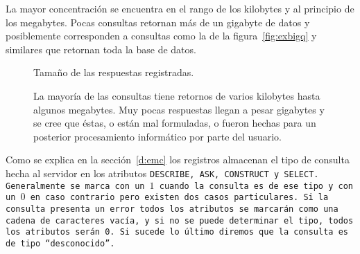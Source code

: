 La mayor concentración se encuentra en el rango de los kilobytes y al principio
de los megabytes.
Pocas consultas retornan más de un gigabyte de datos y posiblemente
corresponden a consultas como la de la figura~\ref{fig:exbigq} y similares que
retornan toda la base de datos.

\begin{figure}[ht]
  \caption{Tamaño de las respuestas registradas.}\label{fig:size}
  \vspace{-.2cm}
  \caption*{\small
    La mayoría de las consultas tiene retornos de varios kilobytes hasta algunos
    megabytes. Muy pocas respuestas llegan a pesar gigabytes y se cree
    que éstas, o están mal formuladas, o fueron hechas para un posterior
    procesamiento informático por parte del usuario. 
  }
\end{figure}

Como se explica en la sección~\ref{d:emc} los registros almacenan el tipo de
consulta hecha al servidor en los atributos \tt{DESCRIBE}, \tt{ASK},
\tt{CONSTRUCT} y \tt{SELECT}. Generalmente se marca con un $1$ cuando la
consulta es de ese tipo y con un $0$ en caso contrario pero existen dos casos
particulares.
Si la consulta presenta un error todos los atributos se marcarán como una cadena
de caracteres vacía, y si no se puede determinar el tipo, todos los atributos
serán 0. Si sucede lo último diremos que la consulta es de tipo ``desconocido''.

